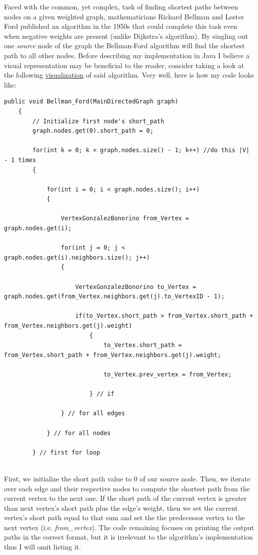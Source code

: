 \documentclass[letterpaper, 10pt]{article}
\begin{document}
Faced with the common, yet complex, task of finding shortest paths between nodes on a given weighted graph, mathematicians Richard Bellman and Lester Ford published an algorithm in the 1950s that could complete this task even when negative weights are present (unlike Dijkstra's algorithm). By singling out one \textit{source} node of the graph the Bellman-Ford algorithm will find the shortest path to all other nodes. Before describing my implementation in Java I believe a visual representation may be beneficial to the reader, consider taking a look at the following \href{https://visualgo.net/en/sssp}{visualization} of said algorithm. Very well, here is how my code looks like:
\begin{lstlisting}
public void Bellman_Ford(MainDirectedGraph graph)
    {
        // Initialize first node's short_path
        graph.nodes.get(0).short_path = 0;
        
        for(int k = 0; k < graph.nodes.size() - 1; k++) //do this |V| - 1 times
        {
   
            for(int i = 0; i < graph.nodes.size(); i++)
            {
            	
            	VertexGonzalezBonorino from_Vertex = graph.nodes.get(i);
            	
                for(int j = 0; j < graph.nodes.get(i).neighbors.size(); j++)
                {
                	
                	VertexGonzalezBonorino to_Vertex = graph.nodes.get(from_Vertex.neighbors.get(j).to_VertexID - 1);
                	
                    if(to_Vertex.short_path > from_Vertex.short_path + from_Vertex.neighbors.get(j).weight)
	                    {
	                        to_Vertex.short_path = from_Vertex.short_path + from_Vertex.neighbors.get(j).weight;

	                        to_Vertex.prev_vertex = from_Vertex;
	                        
	                    } // if
                    
                } // for all edges
                
            } // for all nodes
            
        } // first for loop
\end{lstlisting}
\\
First, we initialize the short path value to 0 of our source node. Then, we iterate over each edge and their respective nodes to compute the shortest path from the current vertex to the next one. If the short path of the current vertex is greater than next vertex's short path plus the edge's weight, then we set the current vertex's short path equal to that sum and set the the predecessor vertex to the next vertex (i.e. \textit{from\_vertex}). The code remaining focuses on printing the output paths in the correct format, but it is irrelevant to the algorithm's implementation thus I will omit listing it. 
\\
\end{document}

